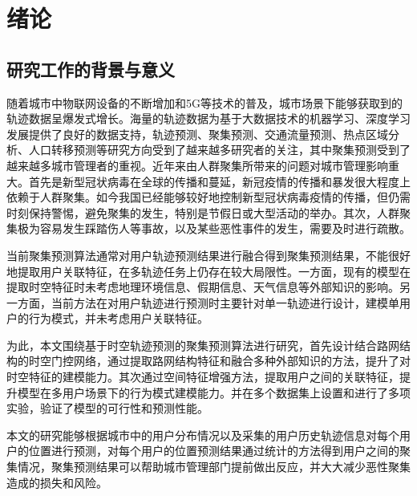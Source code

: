 \documentclass[master]{thesis-uestc}
\begin{document}
\thesistableofcontents

\chapter{绪\hspace{6pt}论}

\section{研究工作的背景与意义}
随着城市中物联网设备的不断增加和5G等技术的普及，城市场景下能够获取到的轨迹数据呈爆发式增长。海量的轨迹数据为基于大数据技术的机器学习、深度学习发展提供了良好的数据支持，轨迹预测、聚集预测、交通流量预测、热点区域分析、人口转移预测等研究方向受到了越来越多研究者的关注，其中聚集预测受到了越来越多城市管理者的重视。近年来由人群聚集所带来的问题对城市管理影响重大。首先是新型冠状病毒在全球的传播和蔓延，新冠疫情的传播和暴发很大程度上依赖于人群聚集。如今我国已经能够较好地控制新型冠状病毒疫情的传播，但仍需时刻保持警惕，避免聚集的发生，特别是节假日或大型活动的举办。其次，人群聚集极为容易发生踩踏伤人等事故，以及某些恶性事件的发生，需要及时进行疏散。

当前聚集预测算法通常对用户轨迹预测结果进行融合得到聚集预测结果，不能很好地提取用户关联特征，在多轨迹任务上仍存在较大局限性。一方面，现有的模型在提取时空特征时未考虑地理环境信息、假期信息、天气信息等外部知识的影响。另一方面，当前方法在对用户轨迹进行预测时主要针对单一轨迹进行设计，建模单用户的行为模式，并未考虑用户关联特征。

为此，本文围绕基于时空轨迹预测的聚集预测算法进行研究，首先设计结合路网结构的时空门控网络，通过提取路网结构特征和融合多种外部知识的方法，提升了对时空特征的建模能力。其次通过空间特征增强方法，提取用户之间的关联特征，提升模型在多用户场景下的行为模式建模能力。并在多个数据集上设置和进行了多项实验，验证了模型的可行性和预测性能。

本文的研究能够根据城市中的用户分布情况以及采集的用户历史轨迹信息对每个用户的位置进行预测，对每个用户的位置预测结果通过统计的方法得到用户之间的聚集情况，聚集预测结果可以帮助城市管理部门提前做出反应，并大大减少恶性聚集造成的损失和风险。
\end{document}
